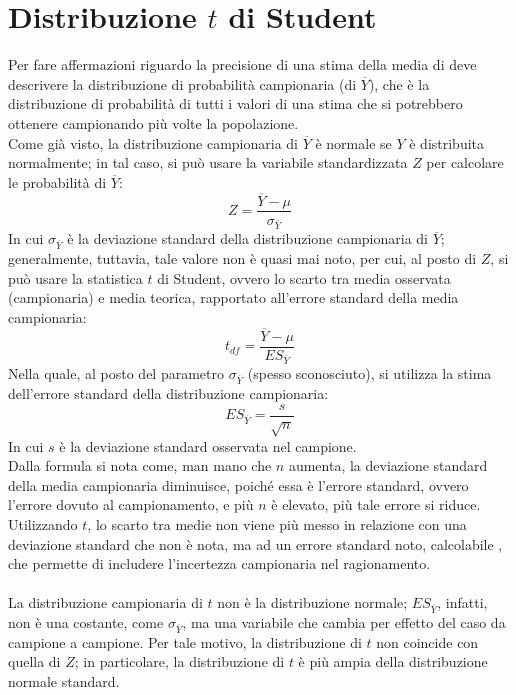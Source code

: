 \documentclass[10pt, draft]{book}
\begin{document}
\section{Distribuzione \texorpdfstring{$t$}{Lg} di Student}
Per fare affermazioni riguardo la precisione di una stima della media di deve descrivere la distribuzione di probabilità campionaria (di $\overline{Y}$), che è la distribuzione di probabilità di tutti i valori di una stima che si potrebbero ottenere campionando più volte la popolazione.
\\
Come già visto, la distribuzione campionaria di $\overline{Y}$ è normale se $Y$ è distribuita normalmente; in tal caso, si può usare la variabile standardizzata $Z$ per calcolare le probabilità di $\overline{Y}$:
\begin{equation}
    Z = \frac{\overline{Y}-\mu}{\sigma_{\overline{Y}}}
\end{equation}
In cui $\sigma_{\overline{Y}}$ è la deviazione standard della distribuzione campionaria di $\overline{Y}$; generalmente, tuttavia, tale valore non è quasi mai noto, per cui, al posto di $Z$, si può usare la statistica $t$ di Student, ovvero lo scarto tra media osservata (campionaria) e media teorica, rapportato all'errore standard della media campionaria:
\begin{equation}
    t_{df} = \frac{\overline{Y}-\mu}{ES_{\overline{Y}}}
\end{equation}
Nella quale, al posto del parametro $\sigma_{\overline{Y}}$ (spesso sconosciuto), si utilizza la stima dell'errore standard della distribuzione campionaria:
\begin{equation}
    ES_{\overline{Y}} = \frac{s}{\sqrt{n}}
\end{equation}
In cui $s$ è la deviazione standard osservata nel campione.
\\
Dalla formula si nota come, man mano che $n$ aumenta, la deviazione standard della media campionaria diminuisce, poiché essa è l'errore standard, ovvero l'errore dovuto al campionamento, e più $n$ è elevato, più tale errore si riduce.
\\
Utilizzando $t$, lo scarto tra medie non viene più messo in relazione con una deviazione standard che non è nota, ma ad un errore standard noto, calcolabile , che permette di includere l'incertezza campionaria nel ragionamento.
\\
\\
La distribuzione campionaria di $t$ non è la distribuzione normale; $ES_{\overline{Y}}$, infatti, non è una costante, come $\sigma_{\overline{Y}}$, ma una variabile che cambia per effetto del caso da campione a campione. Per tale motivo, la distribuzione di $t$ non coincide con quella di $Z$; in particolare, la distribuzione di $t$ è più ampia della distribuzione normale standard.
\end{document}
